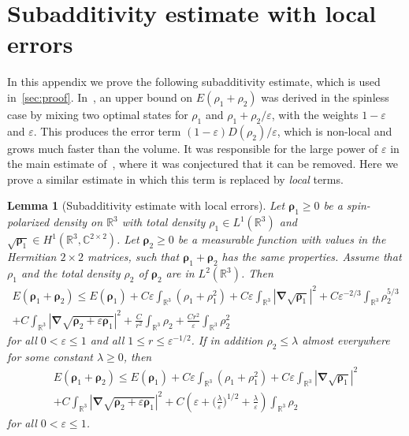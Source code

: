 \documentclass[final,reqno]{amsart}
\newtheorem{lemma}[theorem]{Lemma}
\theoremstyle{remark}
\renewcommand{\le}{\leqslant}
\renewcommand{\ge}{\geqslant}
\renewcommand{\epsilon}{\varepsilon}
\newcommand{\RR}{\mathbb{R}}
\newcommand{\CC}{\mathbb{C}}
\newcommand{\grad}{\bm{\nabla}}
\begin{document}
\section{Subadditivity estimate with local errors}\label{app:subadditivity}
In this appendix we prove the following subadditivity estimate, which is used in~\cref{sec:proof}. In~\cite[Lemma~19]{lewin2020local}, an upper bound on $E(\rho_1+\rho_2)$ was derived in the spinless case by mixing two optimal states for $\rho_1$ and $\rho_1+\rho_2/\epsilon$, with the weights $1-\epsilon$ and $\epsilon$. This produces the error term $(1-\epsilon)D(\rho_2)/\epsilon$, which is non-local and grows much faster than the volume. It was responsible for the large power of $\epsilon$ in the main estimate of~\cite{lewin2020local}, where it was conjectured that it can be removed. Here we prove a similar estimate in which this term is replaced by \emph{local} terms.

\begin{lemma}[Subadditivity estimate with local errors]\label{lem:subadditivity_worse}
Let $\bm{\rho}_1\ge0$ be a spin-polarized density on $\RR^3$ with total density $\rho_1\in L^1(\RR^3)$ and $\sqrt{\bm{\rho}_1}\in H^1(\RR^3,\CC^{2\times2})$. Let $\bm{\rho}_2\ge0$ be a measurable function with values in the Hermitian $2\times2$ matrices, such that $\bm{\rho}_1+\bm{\rho}_2$ has the same properties. Assume that $\rho_1$ and the total density $\rho_2$ of $\bm{\rho}_2$ are in $L^2(\RR^3)$. Then
\begin{multline}\label{eq:subadditivity_worse}
 E(\bm{\rho}_1+\bm{\rho}_2)\le E(\bm{\rho}_1)+C\epsilon\int_{\RR^3}\left(\rho_1+\rho_1^{2}\right)+C\epsilon\int_{\RR^3}\left|\grad\sqrt{\bm{\rho}_1}\right|^2+C\epsilon^{-2/3}\int_{\RR^3}\rho_2^{5/3}\\
 +C\int_{\RR^3}\left|\grad\sqrt{\bm{\rho}_2+\epsilon \bm{\rho}_1}\right|^2+\frac{C}{r^2}\int_{\RR^3}\rho_2+\frac{Cr^2}{\epsilon}\int_{\RR^3}\rho_2^2
\end{multline}
for all $0<\epsilon\le1$ and all $1\le r\le\epsilon^{-1/2}$. If in addition $\rho_2\le\lambda$ almost everywhere for some constant $\lambda\ge0$, then
\begin{multline}\label{eq:subadditivity_lambda}
 E(\bm{\rho}_1+\bm{\rho}_2)\le E(\bm{\rho}_1)+C\epsilon\int_{\RR^3}\left(\rho_1+\rho_1^{2}\right)+C\epsilon\int_{\RR^3}\left|\grad\sqrt{\bm{\rho}_1}\right|^2\\
 +C\int_{\RR^3}\left|\grad\sqrt{\bm{\rho}_2+\epsilon \bm{\rho}_1}\right|^2+C\left(\epsilon+\Big(\frac{\lambda}{\epsilon}\Big)^{1/2}+\frac{\lambda}{\epsilon}\right)\int_{\RR^3}\rho_2
\end{multline}
for all $0<\epsilon\le1$.
\end{lemma}
\end{document}
